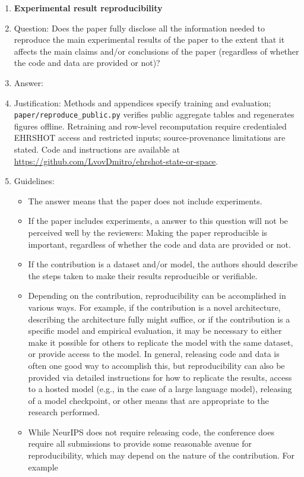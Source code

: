 \documentclass{article}
\begin{document}
\begin{enumerate}
    \item {\bf Experimental result reproducibility}
    \item[] Question: Does the paper fully disclose all the information needed to reproduce the main experimental results of the paper to the extent that it affects the main claims and/or conclusions of the paper (regardless of whether the code and data are provided or not)?
    \item[] Answer: \answerYes{}
    \item[] Justification: Methods and appendices specify training and evaluation; \texttt{paper/reproduce\_public.py} verifies public aggregate tables and regenerates figures offline. Retraining and row-level recomputation require credentialed EHRSHOT access and restricted inputs; source-provenance limitations are stated. Code and instructions are available at \url{https://github.com/LvovDmitro/ehrshot-state-or-space}.
    \item[] Guidelines:
    \begin{itemize}
        \item The answer \answerNA{} means that the paper does not include experiments.
        \item If the paper includes experiments, a \answerNo{} answer to this question will not be perceived well by the reviewers: Making the paper reproducible is important, regardless of whether the code and data are provided or not.
        \item If the contribution is a dataset and\slash or model, the authors should describe the steps taken to make their results reproducible or verifiable. 
        \item Depending on the contribution, reproducibility can be accomplished in various ways. For example, if the contribution is a novel architecture, describing the architecture fully might suffice, or if the contribution is a specific model and empirical evaluation, it may be necessary to either make it possible for others to replicate the model with the same dataset, or provide access to the model. In general, releasing code and data is often one good way to accomplish this, but reproducibility can also be provided via detailed instructions for how to replicate the results, access to a hosted model (e.g., in the case of a large language model), releasing of a model checkpoint, or other means that are appropriate to the research performed.
        \item While NeurIPS does not require releasing code, the conference does require all submissions to provide some reasonable avenue for reproducibility, which may depend on the nature of the contribution. For example

\end{itemize}
\end{enumerate}
\end{document}

